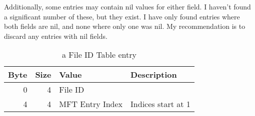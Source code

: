 Additionally, some entries may contain nil values for either field.  I haven't
found a significant number of these, but they exist.  I have only found entries
where both fields are nil, and none where only one was nil.  My recommendation
is to discard any entries with nil fields.

\begin{table}[htbp]\begin{center}
	\caption{a File ID Table entry}
	\label{tab:fident}

	\begin{tabular}{|r|r|l|p{2in}|}
		\hline
		\textbf{Byte} & \textbf{Size} & \textbf{Value} & \textbf{Description}
		\\\hline
		0 & 4 & File ID         &
		\\\hline
		4 & 4 & MFT Entry Index & Indices start at 1
		\\\hline
	\end{tabular}
\end{center}\end{table}

